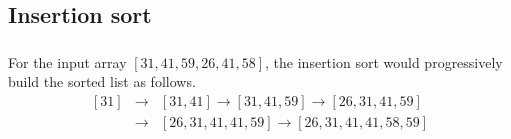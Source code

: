\subsection{Insertion sort}

\subsubsection{}
    For the input array $[31, 41, 59, 26, 41, 58]$, the insertion sort would progressively build the sorted list as follows.
    \begin{eqnarray}
        \nonumber
        [31] &\to& [31, 41] \to [31, 41, 59] \to [26, 31, 41, 59] 
        \\
        &\to& [26, 31, 41, 41, 59] \to [26, 31, 41, 41, 58, 59]
    \end{eqnarray}